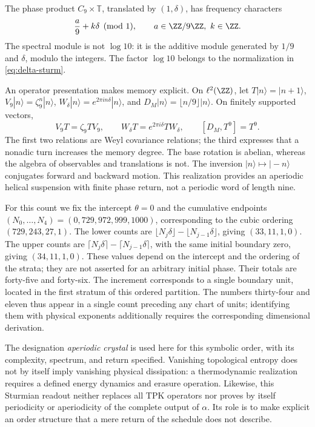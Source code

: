 The phase product \(C_9\times\mathbb T\), translated by \((1,\delta)\), has frequency characters
\[
 \frac a9+k\delta\pmod1,\qquad a\in\ZZ/9\ZZ,\ k\in\ZZ.
\]
The spectral module is not \(\log10\): it is the additive module generated by \(1/9\) and \(\delta\), modulo the integers. The factor \(\log10\) belongs to the normalization in \eqref{eq:delta-sturm}.

An operator presentation makes memory explicit. On \(\ell^2(\ZZ)\), let \(T|n\rangle=|n+1\rangle\), \(V_9|n\rangle=\zeta_9^n|n\rangle\), \(W_\delta|n\rangle=e^{2\pi i n\delta}|n\rangle\), and \(D_M|n\rangle=\lfloor n/9\rfloor|n\rangle\). On finitely supported vectors,
\begin{equation}
 V_9T=\zeta_9TV_9,\qquad
 W_\delta T=e^{2\pi i\delta}TW_\delta,\qquad
 [D_M,T^9]=T^9.
 \label{eq:weyl-relojes}
\end{equation}
The first two relations are Weyl covariance relations; the third expresses that a nonadic turn increases the memory degree. The base rotation is abelian, whereas the algebra of observables and translations is not. The inversion \(|n\rangle\mapsto|-n\rangle\) conjugates forward and backward motion. This realization provides an aperiodic helical suspension with finite phase return, not a periodic word of length nine.



For this count we fix the intercept \(\theta=0\) and the cumulative endpoints \((N_0,\ldots,N_4)=(0,729,972,999,1000)\), corresponding to the cubic ordering \((729,243,27,1)\). The lower counts are \(\lfloor N_j\delta\rfloor-\lfloor N_{j-1}\delta\rfloor\), giving \((33,11,1,0)\). The upper counts are \(\lceil N_j\delta\rceil-\lceil N_{j-1}\delta\rceil\), with the same initial boundary zero, giving \((34,11,1,0)\). These values depend on the intercept and the ordering of the strata; they are not asserted for an arbitrary initial phase. Their totals are forty-five and forty-six. The increment corresponds to a single boundary unit, located in the first stratum of this ordered partition. The numbers thirty-four and eleven thus appear in a single count preceding any chart of units; identifying them with physical exponents additionally requires the corresponding dimensional derivation.

The designation \emph{aperiodic crystal} is used here for this symbolic order, with its complexity, spectrum, and return specified. Vanishing topological entropy does not by itself imply vanishing physical dissipation: a thermodynamic realization requires a defined energy dynamics and erasure operation. Likewise, this Sturmian readout neither replaces all TPK operators nor proves by itself periodicity or aperiodicity of the complete output of \(\alpha\). Its role is to make explicit an order structure that a mere return of the schedule does not describe.




